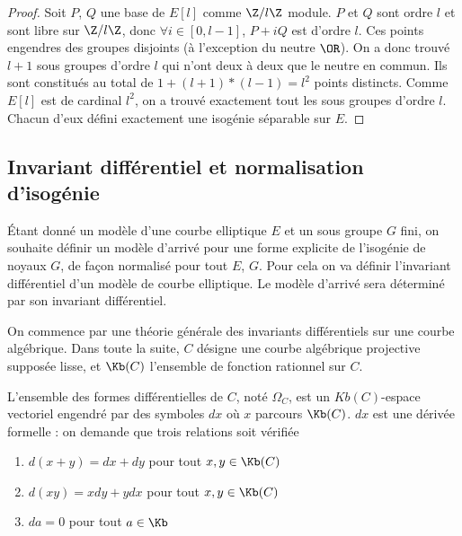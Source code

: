 \begin{proof}
	Soit $P$, $Q$ une base de $E\left[ l\right]$ comme $\Z/l\Z$ module. $P$ et $Q$ sont ordre $l$ et sont libre sur $\Z/l\Z$, donc $\forall i\in\left[ 0 , l - 1\right] $, $P + iQ$ est d'ordre $l$. Ces points engendres des groupes disjoints (à l'exception du neutre $\OR$). On a donc trouvé $l + 1$ sous groupes d'ordre $l$ qui n'ont deux à deux que le neutre en commun. Ils sont constitués au total de $1 + (l+1)*(l - 1) = l^2$ points distincts. Comme $E[l]$ est de cardinal $l^2$, on a trouvé exactement tout les sous groupes d'ordre $l$. Chacun d'eux défini exactement une isogénie séparable sur $E$.
\end{proof}











\subsection{Invariant différentiel et normalisation d'isogénie}

Étant donné un modèle d'une courbe elliptique $E$ et un sous groupe $G$ fini, on souhaite définir un modèle d'arrivé pour une forme explicite de l'isogénie de noyaux $G$, de façon normalisé pour tout $E$, $G$. Pour cela on va définir l'invariant différentiel d'un modèle de courbe elliptique. Le modèle d'arrivé sera déterminé par son invariant différentiel. 

On commence par une théorie générale des invariants différentiels sur une courbe algébrique. Dans toute la suite, $C$ désigne une courbe algébrique projective supposée lisse, et $\Kb(C)$ l'ensemble de fonction rationnel sur $C$. 

\begin{Def}
	L'ensemble des formes différentielles de $C$, noté $\Omega_{C}$, est un $Kb(C)$-espace vectoriel engendré par des symboles $dx$ où $x$ parcours $\Kb(C)$.
	$dx$ est une dérivée formelle : on demande que trois relations soit vérifiée
	\begin{enumerate}
		\item $d(x+y) = dx + dy$ pour tout $x, y \in\Kb(C)$
		\item $d(xy) = xdy + ydx$ pour tout $x, y \in\Kb(C)$
		\item $da = 0$ pour tout $a\in\Kb$
	\end{enumerate}
\end{Def}

